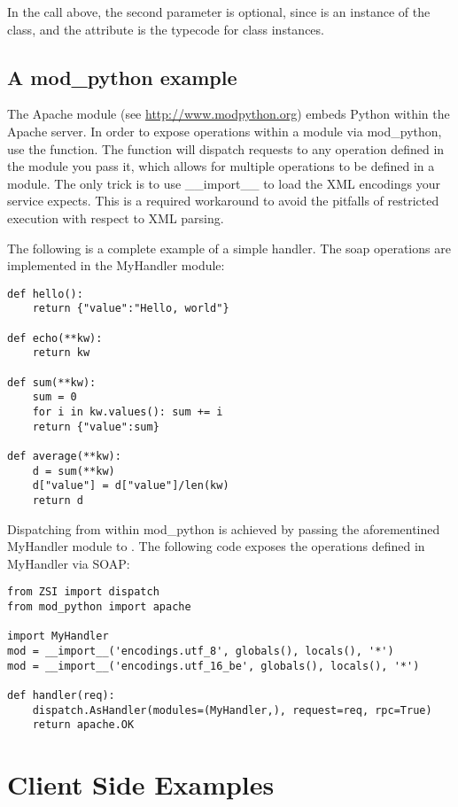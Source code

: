 In the  call above, the second parameter is optional, since
 is an instance of the  class, and the 
 attribute is the typecode for class instances.


\subsection{A mod_python example}

The Apache module  (see
\url{http://www.modpython.org}) embeds Python within the Apache server.
In order to expose operations within a module via mod_python, use the 
 function.  The 
function will dispatch requests to any operation defined in the module you
pass it, which allows for multiple operations to be defined in a module.
The only trick is to use __import__ to load the XML encodings your service 
expects.  This is a required workaround to avoid the pitfalls of restricted
execution with respect to XML parsing.

The following is a complete example of a simple handler.  The soap operations
are implemented in the MyHandler module:

\begin{verbatim}
def hello():
    return {"value":"Hello, world"}

def echo(**kw):
    return kw

def sum(**kw):
    sum = 0
    for i in kw.values(): sum += i
	return {"value":sum}

def average(**kw):
	d = sum(**kw)
    d["value"] = d["value"]/len(kw)
	return d
\end{verbatim}

Dispatching from within mod_python is achieved by passing the aforementined
MyHandler module to .  The following code exposes
the operations defined in MyHandler via SOAP:

\begin{verbatim}
from ZSI import dispatch
from mod_python import apache

import MyHandler
mod = __import__('encodings.utf_8', globals(), locals(), '*')
mod = __import__('encodings.utf_16_be', globals(), locals(), '*')

def handler(req):
    dispatch.AsHandler(modules=(MyHandler,), request=req, rpc=True)
    return apache.OK
\end{verbatim}


\section{Client Side Examples}

